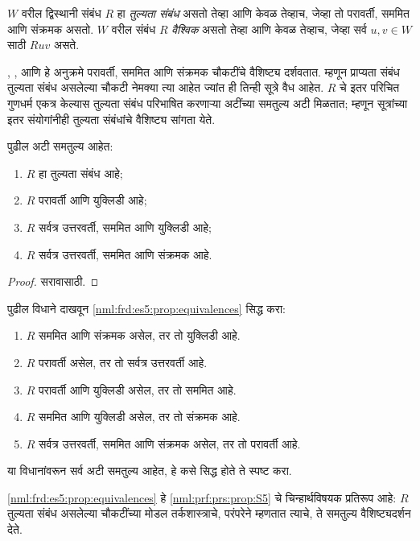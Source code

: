 \begin{defn}
  $W$ वरील द्विस्थानी संबंध $R$ हा \emph{तुल्यता संबंध}
  असतो तेव्हा आणि केवळ तेव्हाच, जेव्हा तो परावर्ती,
  सममित आणि संक्रमक असतो. $W$ वरील संबंध $R$
  \emph{वैश्विक} असतो तेव्हा आणि केवळ तेव्हाच, जेव्हा
  सर्व $u,v \in
  W$ साठी $Ruv$ असते.
\end{defn}

, , आणि  हे अनुक्रमे परावर्ती,
सममित आणि संक्रमक चौकटींचे वैशिष्ट्य दर्शवतात.
म्हणून प्राप्यता संबंध तुल्यता संबंध असलेल्या चौकटी
नेमक्या त्या आहेत ज्यांत ही तिन्ही सूत्रे वैध
आहेत. $R$ चे इतर परिचित गुणधर्म एकत्र केल्यास
तुल्यता संबंध परिभाषित करणाऱ्या अटींच्या समतुल्य
अटी मिळतात; म्हणून सूत्रांच्या इतर संयोगांनीही
तुल्यता संबंधांचे वैशिष्ट्य सांगता येते.

\begin{prop}\label{nml:frd:es5:prop:equivalences}
  पुढील अटी समतुल्य आहेत:
  \begin{enumerate}
  \item $R$ हा तुल्यता संबंध आहे;
  \item $R$ परावर्ती आणि युक्लिडी आहे;
  \item $R$ सर्वत्र उत्तरवर्ती, सममित आणि युक्लिडी आहे;
  \item $R$ सर्वत्र उत्तरवर्ती, सममित आणि संक्रमक आहे.
  \end{enumerate}
\end{prop}

\begin{proof}
  सरावासाठी.
\end{proof}

\begin{prob}
  पुढील विधाने दाखवून \ref{nml:frd:es5:prop:equivalences}
  सिद्ध करा:
  \begin{enumerate}
  \item $R$ सममित आणि संक्रमक असेल, तर तो युक्लिडी आहे.
  \item $R$ परावर्ती असेल, तर तो सर्वत्र उत्तरवर्ती आहे.
  \item $R$ परावर्ती आणि युक्लिडी असेल, तर तो सममित आहे.
  \item $R$ सममित आणि युक्लिडी असेल, तर तो संक्रमक आहे.
  \item $R$ सर्वत्र उत्तरवर्ती, सममित आणि संक्रमक असेल,
    तर तो परावर्ती आहे.
  \end{enumerate}
  या विधानांवरून सर्व अटी समतुल्य आहेत, हे कसे
  सिद्ध होते ते स्पष्ट करा.
\end{prob}

\ref{nml:frd:es5:prop:equivalences} हे \ref{nml:prf:prs:prop:S5}
चे चिन्हार्थविषयक प्रतिरूप आहे: $R$ तुल्यता संबंध
असलेल्या चौकटींच्या मोडल तर्कशास्त्राचे, परंपरेने
 म्हणतात त्याचे, ते समतुल्य वैशिष्ट्यदर्शन देते.

